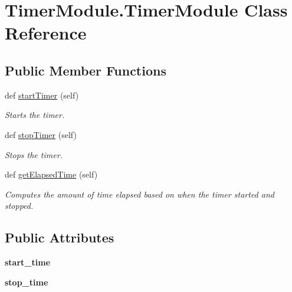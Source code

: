 \hypertarget{classTimerModule_1_1TimerModule}{}\section{Timer\+Module.\+Timer\+Module Class Reference}
\label{classTimerModule_1_1TimerModule}
\subsection*{Public Member Functions}
\begin{DoxyCompactItemize}
\item 
\mbox{\label{classTimerModule_1_1TimerModule_a1a28ee7b5ef46f6bc5700eb35b2b1442}} 
def \mbox{\hyperlink{classTimerModule_1_1TimerModule_a1a28ee7b5ef46f6bc5700eb35b2b1442}{start\+Timer}} (self)
\begin{DoxyCompactList}\small\item\em Starts the timer. \end{DoxyCompactList}\item 
\mbox{\label{classTimerModule_1_1TimerModule_ae9e1ca9d8b4f0af5624f2f7520606d39}} 
def \mbox{\hyperlink{classTimerModule_1_1TimerModule_ae9e1ca9d8b4f0af5624f2f7520606d39}{stop\+Timer}} (self)
\begin{DoxyCompactList}\small\item\em Stops the timer. \end{DoxyCompactList}\item 
def \mbox{\hyperlink{classTimerModule_1_1TimerModule_adfa558e989426995c72df19b318aa50b}{get\+Elapsed\+Time}} (self)
\begin{DoxyCompactList}\small\item\em Computes the amount of time elapsed based on when the timer started and stopped. \end{DoxyCompactList}\end{DoxyCompactItemize}
\subsection*{Public Attributes}
\begin{DoxyCompactItemize}
\item 
\mbox{\label{classTimerModule_1_1TimerModule_a050cc68d818bccf429910185edd3f7de}} 
{\bfseries start\+\_\+time}
\item 
\mbox{\label{classTimerModule_1_1TimerModule_a0e4fce861bce8719b0a969d13942e739}} 
{\bfseries stop\+\_\+time}
\end{DoxyCompactItemize}
